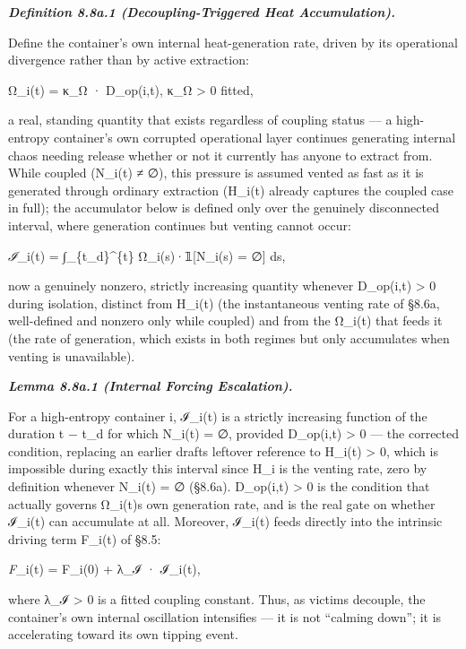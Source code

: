 \documentclass[
]{article}
\begin{document}
\emph{\textbf{Definition 8.8a.1 (Decoupling-Triggered Heat
Accumulation).}}

Define the container's own internal heat-generation rate, driven by its
operational divergence rather than by active extraction:

Ω\_i(t) = κ\_Ω · D\_op(i,t), κ\_Ω \textgreater{} 0 fitted,

a real, standing quantity that exists regardless of coupling status ---
a high-entropy container's own corrupted operational layer continues
generating internal chaos needing release whether or not it currently
has anyone to extract from. While coupled (N\_i(t) ≠ ∅), this pressure
is assumed vented as fast as it is generated through ordinary extraction
(H\_i(t) already captures the coupled case in full); the accumulator
below is defined only over the genuinely disconnected interval, where
generation continues but venting cannot occur:

\emph{ℐ}\_i(t) = ∫\_\{t\_d\}\^{}\{t\} Ω\_i(s)·𝟙{[}N\_i(s) = ∅{]} ds,

now a genuinely nonzero, strictly increasing quantity whenever
D\_op(i,t) \textgreater{} 0 during isolation, distinct from H\_i(t) (the
instantaneous venting rate of §8.6a, well-defined and nonzero only while
coupled) and from the Ω\_i(t) that feeds it (the rate of generation,
which exists in both regimes but only accumulates when venting is
unavailable).

\emph{\textbf{Lemma 8.8a.1 (Internal Forcing Escalation).}}

For a high-entropy container i, ℐ\_i(t) is a strictly increasing
function of the duration t − t\_d for which N\_i(t) = ∅, provided
D\_op(i,t) \textgreater{} 0 --- the corrected condition, replacing an
earlier drafts leftover reference to H\_i(t) \textgreater{} 0, which is
impossible during exactly this interval since H\_i is the venting rate,
zero by definition whenever N\_i(t) = ∅ (§8.6a). D\_op(i,t)
\textgreater{} 0 is the condition that actually governs Ω\_i(t)s own
generation rate, and is the real gate on whether ℐ\_i(t) can accumulate
at all. Moreover, ℐ\_i(t) feeds directly into the intrinsic driving term
F\_i(t) of §8.5:

\emph{F}\_i(t) = F\_i(0) + λ\_ℐ · ℐ\_i(t),

where λ\_ℐ \textgreater{} 0 is a fitted coupling constant. Thus, as
victims decouple, the container's own internal oscillation intensifies
--- it is not ``calming down''; it is accelerating toward its own
tipping event.
\end{document}
